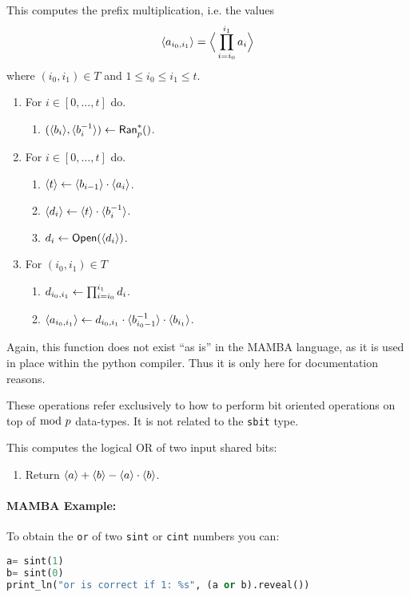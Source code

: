 This computes the prefix multiplication, i.e. the values 
\[ \langle a_{i_0,i_1} \rangle = \Big\langle \prod_{i=i_0}^{i_1} a_i \Big\rangle \]
where $(i_0,i_1) \in T$ and $1 \le i_0 \le i_1 \le t$.
\begin{enumerate}
\item For $i \in [0,\ldots,t]$ do.
\begin{enumerate}
  \item $(\langle b_i \rangle,\langle b_i^{-1} \rangle) \leftarrow \mathsf{Ran}_p^*()$.
\end{enumerate}
\item For $i \in [0,\ldots,t]$ do.
\begin{enumerate}
  \item $\langle t \rangle \leftarrow \langle b_{i-1} \rangle \cdot \langle a_i \rangle$.
  \item $\langle d_i \rangle \leftarrow \langle t \rangle \cdot \langle b_i^{-1} \rangle$.
  \item $d_i \leftarrow {\mathsf{Open}}(\langle d_i \rangle)$.
\end{enumerate}
\item For $(i_0,i_1) \in T$ 
\begin{enumerate}
   \item $d_{i_0,i_1} \leftarrow \prod_{i=i_0}^{i_1} d_i$.
   \item $\langle a_{i_0,i_1} \rangle \leftarrow d_{i_0,i_1} \cdot
	   	\langle b_{i_0-1}^{-1} \rangle \cdot \langle b_{i_1} \rangle$.
\end{enumerate}
\end{enumerate}
Again, this function does not exist ``as is'' in the MAMBA language, as it
is used in place within the python compiler. Thus it is only here
for documentation reasons.



These operations refer exclusively to how to perform bit oriented operations on top of 
$\bmod \; p$ data-types. It is not related to the \verb|sbit| type.

This computes the logical OR of two input shared bits:
\begin{enumerate}
\item Return $\langle a \rangle+\langle b \rangle-\langle a \rangle \cdot \langle b \rangle$.
\end{enumerate}
\paragraph{MAMBA Example:} To obtain the \verb|or| of two \verb|sint| or \verb|cint| numbers you can: 
\begin{lstlisting}[language={python}]
a= sint(1)
b= sint(0)
print_ln("or is correct if 1: %s", (a or b).reveal())
\end{lstlisting}

